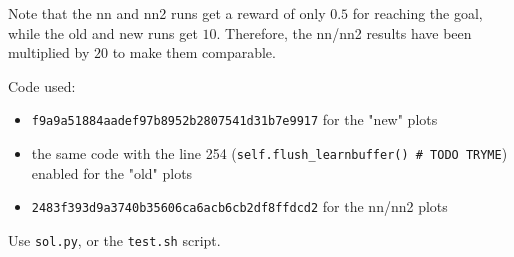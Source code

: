 \documentclass[ngerman]{scrartcl} %
\begin{document}
Note that the nn and nn2 runs get a reward of only $0.5$ for reaching the goal, while the old and new runs get $10$. Therefore, the nn/nn2 results have been multiplied by $20$ to make them comparable.



Code used:
\begin{itemize}
	\item \verb+f9a9a51884aadef97b8952b2807541d31b7e9917+ for the "new" plots
	\item the same code with the line 254 (\verb+self.flush_learnbuffer() # TODO TRYME+) enabled for the "old" plots
	\item \verb+2483f393d9a3740b35606ca6acb6cb2df8ffdcd2+ for the nn/nn2 plots
\end{itemize}
Use \verb+sol.py+, or the \verb+test.sh+ script.
\end{document}
